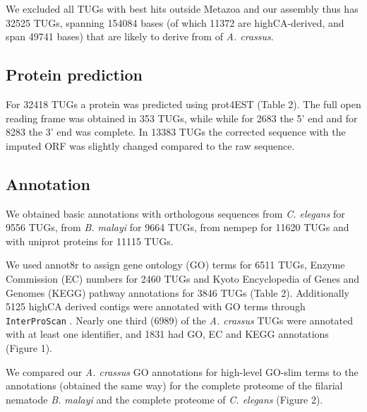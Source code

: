 \documentclass[10pt]{bmc_article}
\newenvironment{bmcformat}{\begin{raggedright}\baselineskip20pt\sloppy\setboolean{publ}{false}}{\end{raggedright}\baselineskip20pt\sloppy}
\begin{document}
\begin{bmcformat}
We excluded all TUGs with best hits outside Metazoa and our assembly
thus has 32525 TUGs, spanning
154084 bases (of which
11372 are highCA-derived, and
span 49741 bases) that
are likely to derive from of \textit{A. crassus}.

\subsection*{Protein prediction}
















For
32418
TUGs a protein was predicted using prot4EST
\cite{wasmuth_prot4est:_2004} (Table 2). The full open reading frame
was obtained in
353 TUGs, while
while for 2683 the
5’ end and for 8283
the 3' end was complete. In 13383 TUGs the
corrected sequence with the imputed ORF was slightly changed compared
to the raw sequence.

\subsection*{Annotation}

We obtained basic annotations with orthologous sequences from
\textit{C. elegans} for
9556 TUGs,
from \textit{B. malayi} for
9664 TUGs,
from nempep \cite{parkinson_nembase:resource_2004, pmid21550347} for
11620
TUGs and with uniprot proteins for
11115 TUGs.

We used annot8r \cite{schmid_annot8r:_2008} to assign gene ontology
(GO) terms for 6511 TUGs, Enzyme Commission (EC) numbers for
2460 TUGs and Kyoto Encyclopedia of Genes and Genomes (KEGG)
pathway annotations for 3846 TUGs (Table 2). Additionally
5125 highCA derived contigs were annotated with GO terms
through \texttt{InterProScan} \cite{pmid11590104}. Nearly one third
(6989) of the \textit{A. crassus} TUGs were
annotated with at least one identifier, and 1831 had
GO, EC and KEGG annotations (Figure 1).

We compared our \textit{A. crassus} GO annotations for high-level
GO-slim terms to the annotations (obtained the same way) for the
complete proteome of the filarial nematode \textit{B. malayi} and the
complete proteome of \textit{C. elegans} (Figure 2).


\end{bmcformat}
\end{document}
